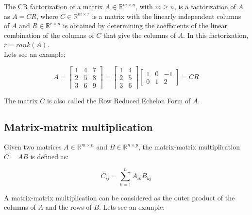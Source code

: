 The CR factorization of a matrix $A \in \mathbb{R}^{m \times n}$, with $m \geq n$, is a factorization of $A$ as $A = CR$, where
$C \in \mathbb{R}^{m \times r}$ is a matrix with the linearly independent columns of $A$ and $R \in \mathbb{R}^{r \times n}$ is 
obtained by determining the coefficients of the linear combination of the columns of $C$ that give the columns of $A$.
In this factorization, $r = rank(A)$.\\

Lets see an example:

\begin{equation}
    A = \begin{bmatrix}
        1 & 4 & 7 \\
        2 & 5 & 8 \\
        3 & 6 & 9
    \end{bmatrix} = \begin{bmatrix}
        1 & 4 \\
        2 & 5 \\
        3 & 6
    \end{bmatrix} \begin{bmatrix}
        1 & 0 & -1 \\
        0 & 1 & 2
    \end{bmatrix} = C R
\end{equation}

The matrix $C$ is also called the Row Reduced Echelon Form of $A$.

\subsection{Matrix-matrix multiplication}

Given two matrices $A \in \mathbb{R}^{m \times n}$ and $B \in \mathbb{R}^{n \times p}$, the matrix-matrix multiplication $C = AB$
is defined as:

\begin{equation}
    C_{ij} = \sum_{k=1}^{n} A_{ik} B_{kj}
\end{equation}

A matrix-matrix multiplication can be considered as the outer product of the columns of $A$ and the rows of $B$. Lets see an example:

